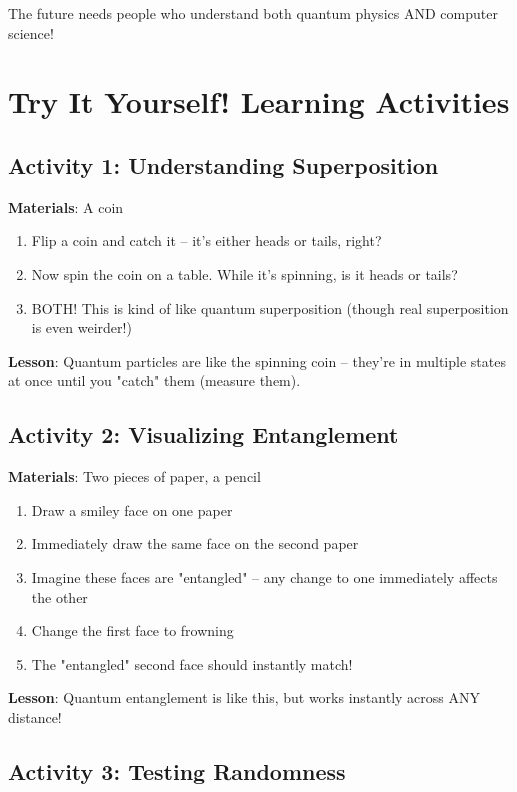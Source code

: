 \documentclass[11pt,a4paper]{article}
\begin{document}
The future needs people who understand both quantum physics AND computer science!

\section{Try It Yourself! Learning Activities}

\subsection{Activity 1: Understanding Superposition}

\textbf{Materials}: A coin

\begin{enumerate}
    \item Flip a coin and catch it -- it's either heads or tails, right?
    \item Now spin the coin on a table. While it's spinning, is it heads or tails?
    \item BOTH! This is kind of like quantum superposition (though real superposition is even weirder!)
\end{enumerate}

\textbf{Lesson}: Quantum particles are like the spinning coin -- they're in multiple states at once until you "catch" them (measure them).

\subsection{Activity 2: Visualizing Entanglement}

\textbf{Materials}: Two pieces of paper, a pencil

\begin{enumerate}
    \item Draw a smiley face on one paper
    \item Immediately draw the same face on the second paper
    \item Imagine these faces are "entangled" -- any change to one immediately affects the other
    \item Change the first face to frowning
    \item The "entangled" second face should instantly match!
\end{enumerate}

\textbf{Lesson}: Quantum entanglement is like this, but works instantly across ANY distance!

\subsection{Activity 3: Testing Randomness}
\end{document}
